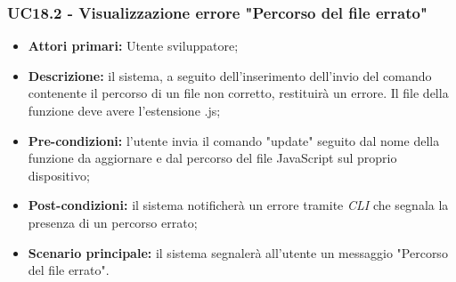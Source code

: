 \subsubsection{UC18.2 - Visualizzazione errore "Percorso del file errato"}
\begin{itemize}
	\item \textbf{Attori primari:} Utente sviluppatore;
	\item \textbf{Descrizione:} il sistema, a seguito dell'inserimento dell'invio del comando contenente il percorso di un file non corretto, restituirà un errore. Il file della funzione deve avere l'estensione .js;
	\item \textbf{Pre-condizioni:}  l'utente invia il comando "update" seguito dal nome della funzione da aggiornare e dal percorso del file JavaScript sul proprio dispositivo;
	\item \textbf{Post-condizioni:} il sistema notificherà un errore tramite \textit{CLI\glo} che segnala la presenza di un percorso errato;
	\item \textbf{Scenario principale:} il sistema segnalerà all'utente un messaggio "Percorso del file errato".
\end{itemize}
